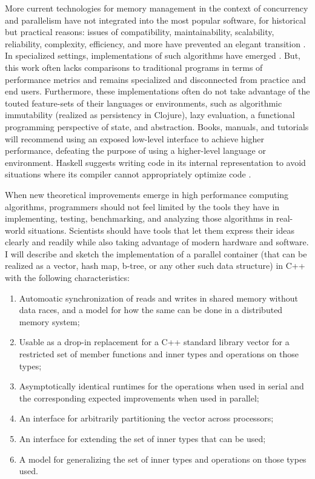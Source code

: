 \documentclass[pageno]{jpaper}
\begin{document}
More current technologies for memory management in the
context of concurrency and parallelism have not integrated into the most popular
software, for historical but practical reasons: issues of compatibility,
maintainability, scalability, reliability, complexity, efficiency, and more have
prevented an elegant transition \cite{kokkos_port}. In specialized settings,
implementations of such algorithms have emerged \cite{erlang_hpc}
\cite{clojure_hpc}. But, this work often lacks comparisons to traditional
programs in terms of performance metrics and remains specialized and
disconnected from practice and end users. Furthermore, these implementations
often do not take advantage of the touted feature-sets of their languages or
environments, such as algorithmic immutability (realized as persistency in
Clojure), lazy evaluation, a functional programming perspective of state, and
abstraction. Books, manuals, and tutorials will recommend using an exposed
low-level interface to achieve higher performance, defeating the purpose of
using a higher-level language or environment. Haskell suggests writing code in
its internal representation to avoid situations where its compiler cannot
appropriately optimize code \cite{haskell_opt}.

When new theoretical improvements emerge in high performance computing
algorithms, programmers should not feel limited by the tools they have in
implementing, testing, benchmarking, and analyzing those algorithms in
real-world situations. Scientists should have tools that let them express their
ideas clearly and readily while also taking advantage of modern hardware and
software. I will describe and sketch the implementation
of a parallel container (that can be realized as a vector, hash map, b-tree, or
any other such data structure) in C++ with the following characteristics:
\begin{enumerate}
    \item Automoatic synchronization of reads and writes in shared memory
        without data races, and a model for how the same can be done in a
        distributed memory system;
    \item Usable as a drop-in replacement for a C++ standard library vector for
        a restricted set of member functions and inner types and operations on
        those types;
    \item Asymptotically identical runtimes for the operations when used in
        serial and the corresponding expected improvements when used in
        parallel;
    \item An interface for arbitrarily partitioning the vector across
        processors;
    \item An interface for extending the set of inner types that can be used;
    \item A model for generalizing the set of inner types and operations on
        those types used.
\end{enumerate}
\end{document}
